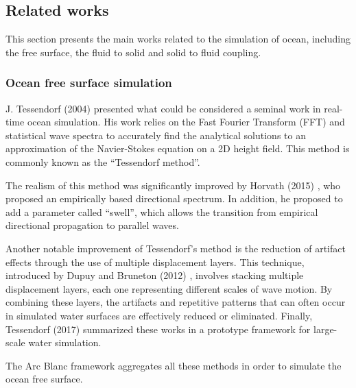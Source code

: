 \documentclass[final]{jcgt}
\def\Framework{The Arc Blanc framework\xspace}
\begin{document}
\subsection{Related works}
\label{sec:relatedwork}
This section presents the main works related to the simulation of ocean, including the free surface, the fluid to solid and solid to fluid coupling.

\subsubsection{Ocean free surface simulation}
\label{subsubsec:oceanFreeSurfaceSim}
J. Tessendorf (2004) \cite{tessendorfSimulatingOceanWater1999} presented what could be considered a seminal work in real-time ocean simulation. His work relies on the Fast Fourier Transform (FFT) and statistical wave spectra to accurately find the analytical solutions to an approximation of the Navier-Stokes equation on a 2D height field. This method is commonly known as the “Tessendorf method”.

The realism of this method was significantly improved by Horvath (2015) \cite{horvathEmpiricalDirectionalWave2015}, who proposed an empirically based directional spectrum.
In addition, he proposed to add a parameter called “swell”, which allows the transition from empirical directional propagation to parallel waves.

Another notable improvement of Tessendorf's method is the reduction of artifact effects through the use of multiple displacement layers.
This technique, introduced by Dupuy and Bruneton (2012) \cite{dupuyRealtimeAnimationRendering2012}, involves stacking multiple displacement layers, each one representing different scales of wave motion.
By combining these layers, the artifacts and repetitive patterns that can often occur in simulated water surfaces are effectively reduced or eliminated.
Finally, Tessendorf (2017) \cite{tessendorfGilliganPrototypeFramework2017} summarized these works in a prototype framework for large-scale water simulation.

\Framework aggregates all these methods in order to simulate the ocean free surface.
\end{document}
